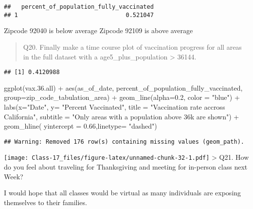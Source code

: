 \documentclass[
]{article}
\newenvironment{Shaded}{\begin{snugshade}}{\end{snugshade}}
\newcommand{\AttributeTok}[1]{\textcolor[rgb]{0.77,0.63,0.00}{#1}}
\newcommand{\ConstantTok}[1]{\textcolor[rgb]{0.00,0.00,0.00}{#1}}
\newcommand{\DecValTok}[1]{\textcolor[rgb]{0.00,0.00,0.81}{#1}}
\newcommand{\FloatTok}[1]{\textcolor[rgb]{0.00,0.00,0.81}{#1}}
\newcommand{\FunctionTok}[1]{\textcolor[rgb]{0.00,0.00,0.00}{#1}}
\newcommand{\NormalTok}[1]{#1}
\newcommand{\OtherTok}[1]{\textcolor[rgb]{0.56,0.35,0.01}{#1}}
\newcommand{\SpecialCharTok}[1]{\textcolor[rgb]{0.00,0.00,0.00}{#1}}
\newcommand{\StringTok}[1]{\textcolor[rgb]{0.31,0.60,0.02}{#1}}
\begin{document}
\begin{verbatim}
##   percent_of_population_fully_vaccinated
## 1                               0.521047
\end{verbatim}

Zipcode 92040 is below average Zipcode 92109 is above average

\begin{quote}
Q20. Finally make a time course plot of vaccination progress for all
areas in the full dataset with a age5\_plus\_population \textgreater{}
36144.
\end{quote}

\begin{Shaded}
\end{Shaded}

\begin{verbatim}
## [1] 0.4120988
\end{verbatim}

\begin{Shaded}
\begin{Highlighting}[]
\FunctionTok{ggplot}\NormalTok{(vax.}\FloatTok{36.}\NormalTok{all) }\SpecialCharTok{+} \FunctionTok{aes}\NormalTok{(as\_of\_date, percent\_of\_population\_fully\_vaccinated, }\AttributeTok{group=}\NormalTok{zip\_code\_tabulation\_area) }\SpecialCharTok{+} \FunctionTok{geom\_line}\NormalTok{(}\AttributeTok{alpha=}\FloatTok{0.2}\NormalTok{, }\AttributeTok{color =} \StringTok{"blue"}\NormalTok{)  }\SpecialCharTok{+} \FunctionTok{labs}\NormalTok{(}\AttributeTok{x=}\StringTok{"Date"}\NormalTok{, }\AttributeTok{y=} \StringTok{"Percent Vaccinated"}\NormalTok{, }\AttributeTok{title =} \StringTok{"Vaccination rate accross California"}\NormalTok{, }\AttributeTok{subtitle =} \StringTok{"Only areas with a population above 36k are shown"}\NormalTok{) }\SpecialCharTok{+} \FunctionTok{geom\_hline}\NormalTok{( }\AttributeTok{yintercept =} \FloatTok{0.66}\NormalTok{,}\AttributeTok{linetype=} \StringTok{"dashed"}\NormalTok{)}
\end{Highlighting}
\end{Shaded}

\begin{verbatim}
## Warning: Removed 176 row(s) containing missing values (geom_path).
\end{verbatim}

\texttt{[image: Class-17\_files/figure-latex/unnamed-chunk-32-1.pdf]}
\textgreater{} Q21. How do you feel about traveling for Thanksgiving and
meeting for in-person class next Week?

I would hope that all classes would be virtual as many individuals are
exposing themselves to their families.
\end{document}
